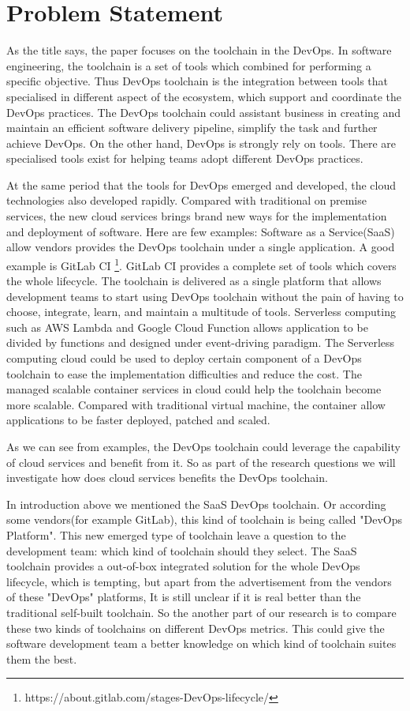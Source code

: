 \section{Problem Statement}
As the title says, the paper focuses on the toolchain in the DevOps. In software engineering, the toolchain is a set of tools which combined for performing a specific objective. Thus DevOps toolchain is the integration between tools that specialised in different aspect of the ecosystem, which support and coordinate the DevOps practices. The DevOps toolchain could assistant business in creating and maintain an efficient software delivery pipeline, simplify the task and further achieve DevOps.\cite{DevOpsto7:online}\cite{Toolchai10:online} On the other hand, DevOps is strongly rely on tools. There are specialised tools exist for helping teams adopt different DevOps practices\cite{zhu2016devops}.
\par
At the same period that the tools for DevOps emerged and developed, the cloud technologies also developed rapidly. Compared with traditional on premise services, the new cloud services brings brand new ways for the implementation and deployment of software. Here are few examples:
Software as a Service(SaaS) allow vendors provides the DevOps toolchain under a single application. A good example is GitLab CI \footnote{https://about.gitlab.com/stages-DevOps-lifecycle/}. GitLab CI provides a complete set of tools which covers the whole lifecycle. The toolchain is delivered as a single platform that allows development teams to start using DevOps toolchain without the pain of having to choose, integrate, learn, and maintain a multitude of tools. Serverless computing such as AWS Lambda and Google Cloud Function allows application to be divided by functions and designed under event-driving paradigm. The Serverless computing cloud could be used to deploy certain component of a DevOps toolchain to ease the implementation difficulties and reduce the cost.
The managed scalable container services in cloud could help the toolchain become more scalable. Compared with traditional virtual machine, the container allow applications to be faster deployed, patched and scaled.\cite{WhatareC61:online}
\par
As we can see from examples, the DevOps toolchain could leverage the capability of cloud services and benefit from it. So as part of the research questions we will investigate how does cloud services benefits the DevOps toolchain.
\par
In introduction above we mentioned the SaaS DevOps toolchain. Or according some vendors(for example GitLab), this kind of toolchain is being called "DevOps Platform". This new emerged type of toolchain leave a question to the development team: which kind of toolchain should they select. The SaaS toolchain provides a out-of-box integrated solution for the whole DevOps lifecycle, which is tempting, but apart from the advertisement from the vendors of these "DevOps" platforms, It is still unclear if it is real better than the traditional self-built toolchain. So the another part of our research is to compare these two kinds of toolchains on different DevOps metrics. This could give the software development team a better knowledge on which kind of toolchain suites them the best.
